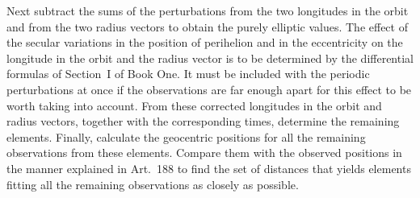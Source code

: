 Next subtract the sums of the perturbations from the two longitudes in
the orbit and from the two radius vectors to obtain the purely elliptic
values. The effect of the secular variations in the position of perihelion
and in the eccentricity on the longitude in the orbit and the radius vector
is to be determined by the differential formulas of Section~I of Book One.
It must be included with the periodic perturbations at once if the
observations are far enough apart for this effect to be worth taking into
account. From these corrected longitudes in the orbit and radius vectors,
together with the corresponding times, determine the remaining elements.
Finally, calculate the geocentric positions for all the remaining
observations from these elements. Compare them with the observed positions
in the manner explained in Art.~188 to find the set of distances that yields
elements fitting all the remaining observations as closely as possible.
